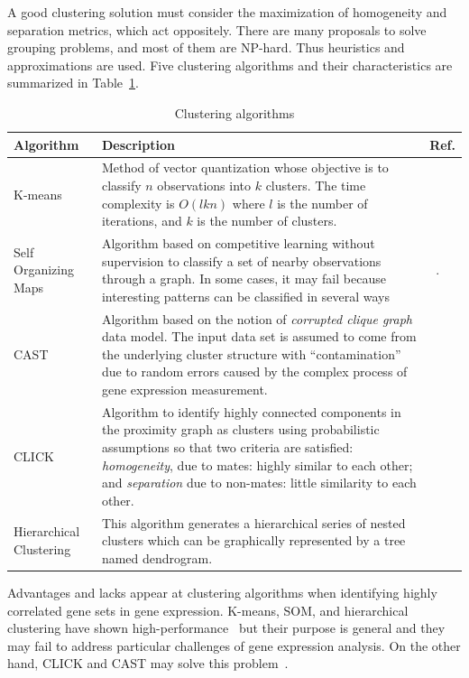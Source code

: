\documentclass[a4paper,conference]{IEEEtran}
\begin{document}
A good clustering solution must consider the maximization of homogeneity and separation metrics, which act oppositely. There are many proposals to solve grouping problems, and most of them are NP-hard. Thus heuristics and approximations are used. Five clustering algorithms and their characteristics are summarized in Table~\ref{Clustering_alg}.

\begin{table}[!h]
\renewcommand{\arraystretch}{1.5}
\caption{Clustering algorithms}
\label{Clustering_alg}
\centering
\begin{tabular}{p{2cm}|p{5.4cm}|p{0.3cm}} 
\hline
\bfseries Algorithm & \bfseries Description & Ref. \\
\hline
K-means & Method of vector quantization whose objective is to classify $n$ observations into $k$ clusters. The time complexity is $O(lkn)$ where $l$ is the number of iterations, and $k$ is the number of clusters. &~\cite{levine2015data} \\
\hline
Self Organizing Maps & Algorithm based on competitive learning without supervision to classify a set of nearby observations through a graph. In some cases, it may fail because interesting patterns can be classified in several ways~\cite{k2015analysis} &~\cite{tamayo1999interpreting}. \\
\hline
CAST & Algorithm based on the notion of \textit{corrupted clique graph} data model. The input data set is assumed to come from the underlying cluster structure with ``contamination'' due to random errors caused by the complex process of gene expression measurement. &~\cite{bellaachia2002cast}\\
\hline
CLICK & Algorithm to identify highly connected components in the proximity graph as clusters using probabilistic assumptions so that two criteria are satisfied: \textit{homogeneity}, due to mates: highly similar to each other; and \textit{separation} due to non-mates: little similarity to each other. &~\cite{conesa2016survey} \\
\hline
Hierarchical Clustering & This algorithm generates a hierarchical series of nested clusters which can be graphically represented by a tree named dendrogram. &~\cite{galili2015dendextend} \\
\hline
\end{tabular}
\end{table}

Advantages and lacks appear at clustering algorithms when identifying highly correlated gene sets in gene expression. K-means, SOM, and hierarchical clustering have shown high-performance~\cite{weber2016comparison} but their purpose is general and they may fail to address particular challenges of gene expression analysis.
On the other hand, CLICK and CAST may solve this problem~\cite{salazar2016gene}.  
\end{document}
